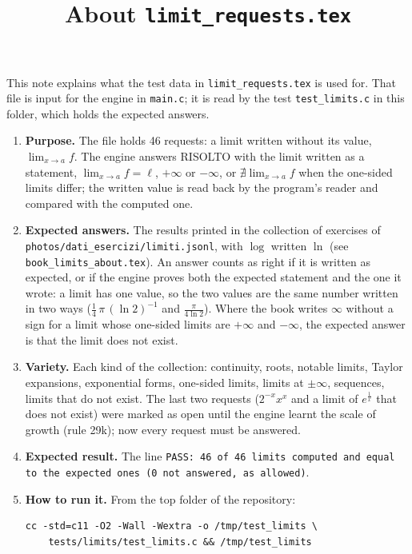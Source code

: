 \documentclass[11pt,a4paper]{article}
\title{About \texttt{limit\_requests.tex}}
\author{}
\date{}
\begin{document}
\maketitle
This note explains what the test data in \texttt{limit\_requests.tex} is used for. That file is input for the engine in \texttt{main.c}; it is read by the test \texttt{test\_limits.c} in this folder, which holds the expected answers.

\begin{enumerate}
\item \textbf{Purpose.} The file holds 46 requests: a limit written without its value, $\lim_{x \to a} f$. The engine answers RISOLTO with the limit written as a statement, $\lim_{x \to a} f = \ell$, $+\infty$ or $-\infty$, or $\nexists \lim_{x \to a} f$ when the one-sided limits differ; the written value is read back by the program's reader and compared with the computed one.

\item \textbf{Expected answers.} The results printed in the collection of exercises of \texttt{photos/dati\_esercizi/limiti.jsonl}, with $\log$ written $\ln$ (see \texttt{book\_limits\_about.tex}). An answer counts as right if it is written as expected, or if the engine proves both the expected statement and the one it wrote: a limit has one value, so the two values are the same number written in two ways ($\frac{1}{4}\,\pi\,\left(\ln 2\right)^{-1}$ and $\frac{\pi}{4 \ln 2}$). Where the book writes $\infty$ without a sign for a limit whose one-sided limits are $+\infty$ and $-\infty$, the expected answer is that the limit does not exist.

\item \textbf{Variety.} Each kind of the collection: continuity, roots, notable limits, Taylor expansions, exponential forms, one-sided limits, limits at $\pm\infty$, sequences, limits that do not exist. The last two requests ($2^{-x} x^{x}$ and a limit of $e^{\frac{1}{x}}$ that does not exist) were marked as open until the engine learnt the scale of growth (rule 29k); now every request must be answered.

\item \textbf{Expected result.} The line \texttt{PASS: 46 of 46 limits computed and equal to the expected ones (0 not answered, as allowed)}.

\item \textbf{How to run it.} From the top folder of the repository:
\begin{verbatim}
cc -std=c11 -O2 -Wall -Wextra -o /tmp/test_limits \
    tests/limits/test_limits.c && /tmp/test_limits
\end{verbatim}
\end{enumerate}
\end{document}
